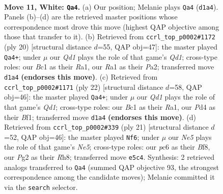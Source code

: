 \documentclass[11pt]{article}
\begin{document}
\clearpage

\begin{figure}[p]\centering
\begin{subfigure}{0.46\textwidth}\centering
\resizebox{\linewidth}{!}{%
\newchessgame
\chessboard[
  setfen={r1b1kb1r/ppq2ppp/2p1p3/3nN3/3P4/3BP3/PP3PPP/R1BQK2R w KQkq - 2 11},
  showmover=false,
  pgfstyle=straightmove, color=movearrow, markmove={d1-a4}
]}
\caption{}
\end{subfigure}\hfill
\begin{subfigure}{0.46\textwidth}\centering
\resizebox{\linewidth}{!}{%
\newchessgame
\chessboard[
  setfen={r1b1kb1r/1pq2ppp/p3pn2/2p1N3/3P4/2P1B3/PP3PPP/R2QKB1R w KQkq - 2 11},
  showmover=false,
  pgfstyle=straightmove, color=movearrow, markmove={d1-a4}
]}
\caption{}
\end{subfigure}
\\[4pt]
\begin{subfigure}{0.46\textwidth}\centering
\resizebox{\linewidth}{!}{%
\newchessgame
\chessboard[
  setfen={r1b1kb1r/1pq2ppp/p3pn2/4N3/3B4/2P5/PP3PPP/R2QKB1R w KQkq - 1 12},
  showmover=false,
  pgfstyle=straightmove, color=movearrow, markmove={d1-a4}
]}
\caption{}
\end{subfigure}\hfill
\begin{subfigure}{0.46\textwidth}\centering
\resizebox{\linewidth}{!}{%
\newchessgame
\chessboard[
  setfen={r1bqkb1r/pp3p1p/3p2p1/4p3/1PP1n3/4PN2/P1Q2PPP/R1B1KB1R b KQkq - 1 11},
  showmover=false,
  pgfstyle=straightmove, color=movearrow, markmove={e4-f6}
]}
\caption{}
\end{subfigure}
\caption{\textbf{Move 11, White: \texttt{Qa4}.} (a) Our position; Melanie plays \texttt{Qa4} (\texttt{d1a4}). Panels (b)--(d) are the retrieved master positions whose correspondence most drove this move (highest QAP objective among those that transfer to it). (b) Retrieved from \texttt{ccrl\_top\_p0002\#1172} (ply 20) [structural distance $d$=55, QAP obj=47]: the master played \texttt{Qa4+}; under $\mu$ our \emph{Qd1} plays the role of that game's \emph{Qd1}; cross-type roles: our \emph{B}c1 as their \emph{R}a1, our \emph{R}a1 as their \emph{P}a2; transferred move \texttt{d1a4} \textbf{(endorses this move)}. (c) Retrieved from \texttt{ccrl\_top\_p0002\#1171} (ply 22) [structural distance $d$=58, QAP obj=46]: the master played \texttt{Qa4+}; under $\mu$ our \emph{Qd1} plays the role of that game's \emph{Qd1}; cross-type roles: our \emph{B}c1 as their \emph{R}a1, our \emph{P}d4 as their \emph{B}f1; transferred move \texttt{d1a4} \textbf{(endorses this move)}. (d) Retrieved from \texttt{ccrl\_top\_p0002\#339} (ply 21) [structural distance $d$=52, QAP obj=46]: the master played \texttt{Nf6}; under $\mu$ our \emph{Ne5} plays the role of that game's \emph{Ne5}; cross-type roles: our \emph{p}c6 as their \emph{B}f8, our \emph{P}g2 as their \emph{R}h8; transferred move \texttt{e5c4}. Synthesis: 2 retrieved analogs transferred to \texttt{Qa4} (summed QAP objective 93, the strongest correspondence among the candidate moves); Melanie committed it via the \texttt{search} selector.}
\label{fig:thought-m20}
\end{figure}
\end{document}
